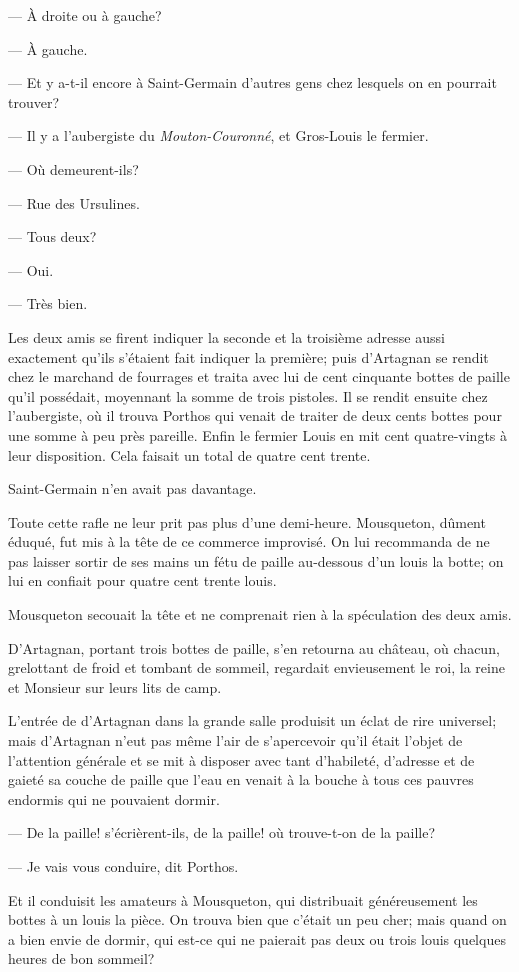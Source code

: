 — À droite ou à gauche?

— À gauche.

— Et y a-t-il encore à Saint-Germain d'autres gens chez lesquels on en pourrait trouver?

— Il y a l'aubergiste du \textit{Mouton-Couronné}, et Gros-Louis le fermier.

— Où demeurent-ils?

— Rue des Ursulines.

— Tous deux?

— Oui.

— Très bien.

Les deux amis se firent indiquer la seconde et la troisième adresse aussi exactement qu'ils s'étaient fait indiquer la première; puis d'Artagnan se rendit chez le marchand de fourrages et traita avec lui de cent cinquante bottes de paille qu'il possédait, moyennant la somme de trois pistoles. Il se rendit ensuite chez l'aubergiste, où il trouva Porthos qui venait de traiter de deux cents bottes pour une somme à peu près pareille. Enfin le fermier Louis en mit cent quatre-vingts à leur disposition. Cela faisait un total de quatre cent trente.

Saint-Germain n'en avait pas davantage.

Toute cette rafle ne leur prit pas plus d'une demi-heure. Mousqueton, dûment éduqué, fut mis à la tête de ce commerce improvisé. On lui recommanda de ne pas laisser sortir de ses mains un fétu de paille au-dessous d'un louis la botte; on lui en confiait pour quatre cent trente louis.

Mousqueton secouait la tête et ne comprenait rien à la spéculation des deux amis.

D'Artagnan, portant trois bottes de paille, s'en retourna au château, où chacun, grelottant de froid et tombant de sommeil, regardait envieusement le roi, la reine et Monsieur sur leurs lits de camp.

L'entrée de d'Artagnan dans la grande salle produisit un éclat de rire universel; mais d'Artagnan n'eut pas même l'air de s'apercevoir qu'il était l'objet de l'attention générale et se mit à disposer avec tant d'habileté, d'adresse et de gaieté sa couche de paille que l'eau en venait à la bouche à tous ces pauvres endormis qui ne pouvaient dormir.

— De la paille! s'écrièrent-ils, de la paille! où trouve-t-on de la paille?

— Je vais vous conduire, dit Porthos.

Et il conduisit les amateurs à Mousqueton, qui distribuait généreusement les bottes à un louis la pièce. On trouva bien que c'était un peu cher; mais quand on a bien envie de dormir, qui est-ce qui ne paierait pas deux ou trois louis quelques heures de bon sommeil?

